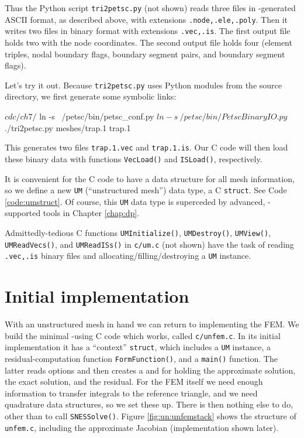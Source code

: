 Thus the Python script \texttt{tri2petsc.py} (not shown) reads three files in \Triangle-generated ASCII format, as described above, with extensions \texttt{.node,.ele,.poly}.  Then it writes two files in \PETSc binary format with extensions \texttt{.vec,.is}.  The first output file holds two \pVecs with the node coordinates.  The second output file holds four \pISs (element triples, nodal boundary flags, boundary segment pairs, and boundary segment flags).

Let's try it out.  Because \texttt{tri2petsc.py} uses Python modules from the \PETSc source directory, we first generate some symbolic links:
\begin{cline}
$ cd c/ch7/
$ ln -s ~/petsc/bin/petsc_conf.py
$ ln -s ~/petsc/bin/PetscBinaryIO.py
$ ./tri2petsc.py meshes/trap.1 trap.1
\end{cline}
This generates two files \texttt{trap.1.vec} and \texttt{trap.1.is}.  Our C code will then load these binary data with \PETSc functions  \texttt{VecLoad()} and \texttt{ISLoad()}, respectively.

It is convenient for the C code to have a data structure for all mesh information, so we define a new \texttt{UM} (``unstructured mesh'') data type, a C \texttt{struct}.  See Code \ref{code:umstruct}.  Of course, this \texttt{UM} data type is superceded by advanced, \PETSc-supported tools in Chapter \ref{chap:dp}.


Admittedly-tedious C functions \texttt{UMInitialize()}, \texttt{UMDestroy()}, \texttt{UMView()}, \texttt{UMReadVecs()}, and \texttt{UMReadISs()} in \texttt{c/\CODELOC um.c} (not shown) have the task of reading \texttt{.vec,.is} binary files and allocating/filling/destroying a \texttt{UM} instance.

\section{Initial implementation}

With an unstructured mesh in hand we can return to implementing the FEM.  We build the minimal \pSNES-using C code which works, called \texttt{c/\CODELOC unfem.c}.  In its initial implementation it has a ``context'' \texttt{struct}, which includes a \texttt{UM} instance, a residual-computation function \texttt{FormFunction()}, and a \texttt{main()} function.  The latter reads options and then creates a \pSNES and \pVecs for holding the approximate solution, the exact solution, and the residual.  For the FEM itself we need enough information to transfer integrals to the reference triangle, and we need quadrature data structures, so we set these up.  There is then nothing else to do, other than to call \texttt{SNESSolve()}.  Figure \ref{fig:un:unfemstack} shows the structure of \texttt{unfem.c}, including the approximate Jacobian (implementation shown later).

